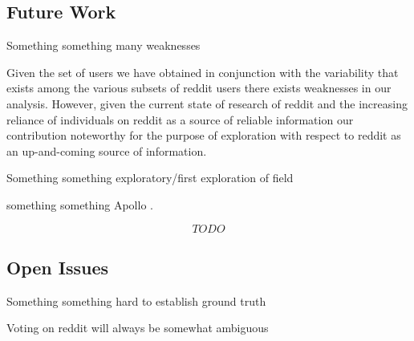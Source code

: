 \lipsum[1]

\subsection{Future Work} %
\label{sub:future_work}

Something something many weaknesses

Given the set of users we have obtained in conjunction with the variability that
exists among the various subsets of reddit users there exists weaknesses in our
analysis. However, given the current state of research of reddit and the
increasing reliance of individuals on reddit as a source of reliable information
our contribution noteworthy for the purpose of exploration with respect to
reddit as an up-and-coming source of information.

Something something exploratory/first exploration of field

something something Apollo \cite{Le:2011:DDL:2070942.2071018}.

\[TODO\]



\subsection{Open Issues} %
\label{sub:open_issues}

Something something hard to establish ground truth

Voting on reddit will always be somewhat ambiguous

